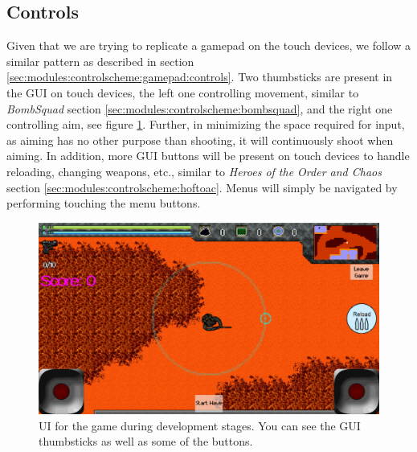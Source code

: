 \subsection{Controls}
Given that we are trying to replicate a gamepad on the touch devices, we follow a similar pattern as described in section \ref{sec:modules:controlscheme:gamepad:controls}.
Two thumbsticks are present in the GUI on touch devices, the left one controlling movement, similar to \textit{BombSquad} section \ref{sec:modules:controlscheme:bombsquad}, and the right one controlling aim, see figure \ref{sec:modules:controlscheme:touch:controls:ui}.
Further, in minimizing the space required for input, as aiming has no other purpose than shooting, it will continuously shoot when aiming.
In addition, more GUI buttons will be present on touch devices to handle reloading, changing weapons, etc., similar to \textit{Heroes of the Order and Chaos} section \ref{sec:modules:controlscheme:hoftoac}.
Menus will simply be navigated by performing touching the menu buttons.

\begin{figure}[H]
\centering
\includegraphics[width=1\textwidth]{figures/controlscheme/ui}
\caption{UI for the game during development stages. You can see the GUI thumbsticks as well as some of the buttons.}
\label{sec:modules:controlscheme:touch:controls:ui}
\end{figure}